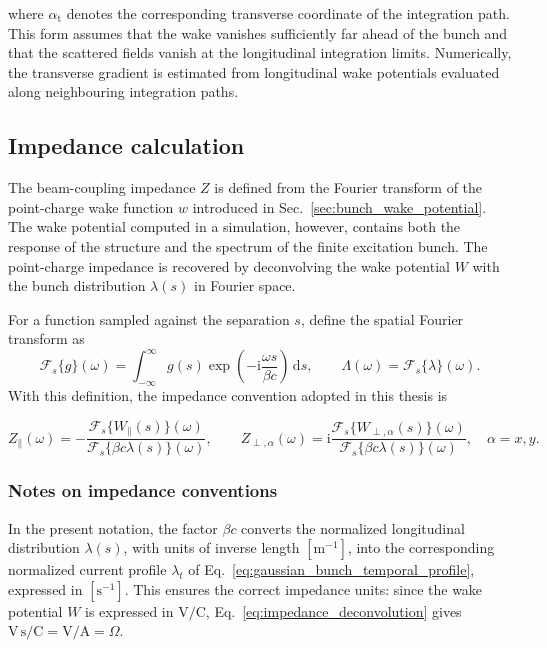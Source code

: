 where $\alpha_{\mathrm{t}}$ denotes the corresponding transverse coordinate of the integration path. This form assumes that the wake vanishes sufficiently far ahead of the bunch and that the scattered fields vanish at the longitudinal integration limits. Numerically, the transverse gradient is estimated from longitudinal wake potentials evaluated along neighbouring integration paths.

\subsection{Impedance calculation}
\label{sec:wake_impedance_calculation}

The beam-coupling impedance $Z$ is defined from the Fourier transform of the point-charge wake function $w$ introduced in Sec.~\ref{sec:bunch_wake_potential}. The wake potential computed in a simulation, however, contains both the response of the structure and the spectrum of the finite excitation bunch. The point-charge impedance is recovered by deconvolving the wake potential $W$ with the bunch distribution $\lambda(s)$ in Fourier space.

For a function sampled against the separation $s$, define the spatial Fourier transform as
%
\begin{equation}
\mathcal{F}_s\{g\}(\omega)
=
\int_{-\infty}^{\infty}
g(s)
\exp\left(-\mathrm{i}\frac{\omega s}{\beta c}\right)
\,\mathrm{d}s,
\qquad
\Lambda(\omega)=\mathcal{F}_s\{\lambda\}(\omega).
\label{eq:wake_spatial_fourier_transform}
\end{equation}
%
With this definition, the impedance convention adopted in this thesis is

\begin{equation}
Z_{\parallel}(\omega) = -
\frac{
\mathcal{F}_s\{W_{\parallel}(s)\}(\omega)
}{
\mathcal{F}_s\{\beta c\lambda(s)\}(\omega)
},
\qquad
Z_{\perp,\alpha}(\omega) = \mathrm{i}
\frac{
\mathcal{F}_s\{W_{\perp,\alpha}(s)\}(\omega)
}{
\mathcal{F}_s\{\beta c\lambda(s)\}(\omega)
},
\quad
\alpha=x,y.
\label{eq:impedance_deconvolution}
\end{equation}

\subsubsection{Notes on impedance conventions}
In the present notation, the factor $\beta c$ converts the normalized longitudinal distribution $\lambda(s)$, with units of inverse length $[\mathrm{m}^{-1}]$, into the corresponding normalized current profile $\lambda_t$ of Eq.~\ref{eq:gaussian_bunch_temporal_profile}, expressed in $[\mathrm{s}^{-1}]$. This ensures the correct impedance units: since the wake potential $W$ is expressed in $\mathrm{V/C}$, Eq.~\eqref{eq:impedance_deconvolution} gives $\mathrm{V\,s/C}=\mathrm{V/A}=\Omega$.

